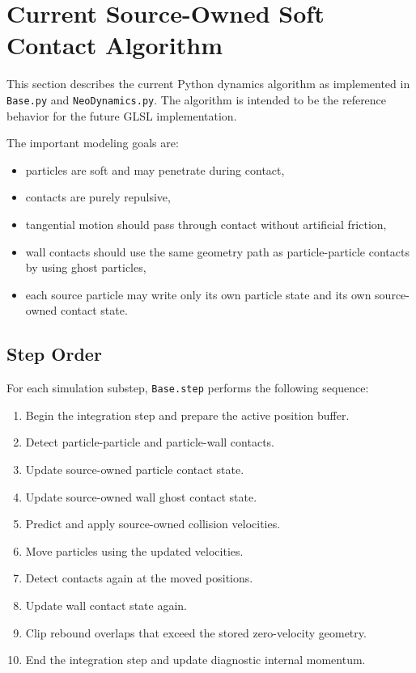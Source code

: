 \section{Current Source-Owned Soft Contact Algorithm}

This section describes the current Python dynamics algorithm as implemented in
\texttt{Base.py} and \texttt{NeoDynamics.py}.  The algorithm is intended to be
the reference behavior for the future GLSL implementation.

The important modeling goals are:
\begin{itemize}
    \item particles are soft and may penetrate during contact,
    \item contacts are purely repulsive,
    \item tangential motion should pass through contact without artificial
          friction,
    \item wall contacts should use the same geometry path as particle-particle
          contacts by using ghost particles,
    \item each source particle may write only its own particle state and its
          own source-owned contact state.
\end{itemize}

\subsection{Step Order}

For each simulation substep, \texttt{Base.step} performs the following sequence:
\begin{enumerate}
    \item Begin the integration step and prepare the active position buffer.
    \item Detect particle-particle and particle-wall contacts.
    \item Update source-owned particle contact state.
    \item Update source-owned wall ghost contact state.
    \item Predict and apply source-owned collision velocities.
    \item Move particles using the updated velocities.
    \item Detect contacts again at the moved positions.
    \item Update wall contact state again.
    \item Clip rebound overlaps that exceed the stored zero-velocity geometry.
    \item End the integration step and update diagnostic internal momentum.
\end{enumerate}


